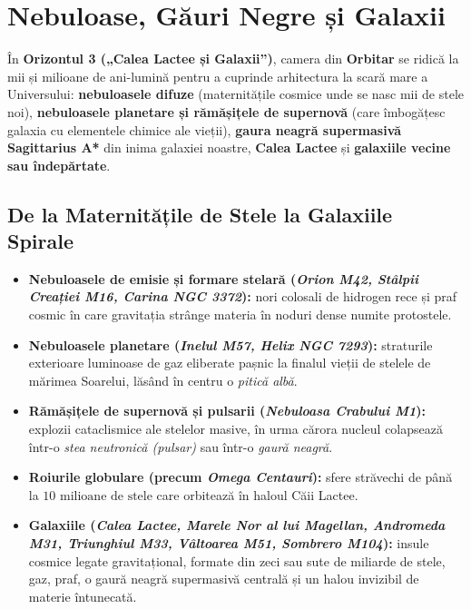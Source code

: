\chapter{Nebuloase, Găuri Negre și Galaxii}
\label{chap:galaxii}

În \textbf{Orizontul 3 („Calea Lactee și Galaxii”)}, camera din \textbf{Orbitar} se ridică la mii și milioane de ani-lumină pentru a cuprinde arhitectura la scară mare a Universului: \textbf{nebuloasele difuze} (maternitățile cosmice unde se nasc mii de stele noi), \textbf{nebuloasele planetare și rămășițele de supernovă} (care îmbogățesc galaxia cu elementele chimice ale vieții), \textbf{gaura neagră supermasivă Sagittarius A*} din inima galaxiei noastre, \textbf{Calea Lactee} și \textbf{galaxiile vecine sau îndepărtate}.

\section*{De la Maternitățile de Stele la Galaxiile Spirale}

\begin{itemize}[leftmargin=1.5em, itemsep=3pt]
  \item \textbf{Nebuloasele de emisie și formare stelară (\emph{Orion M42, Stâlpii Creației M16, Carina NGC 3372}):} nori colosali de hidrogen rece și praf cosmic în care gravitația strânge materia în noduri dense numite protostele.
  \item \textbf{Nebuloasele planetare (\emph{Inelul M57, Helix NGC 7293}):} straturile exterioare luminoase de gaz eliberate pașnic la finalul vieții de stelele de mărimea Soarelui, lăsând în centru o \emph{pitică albă}.
  \item \textbf{Rămășițele de supernovă și pulsarii (\emph{Nebuloasa Crabului M1}):} explozii cataclismice ale stelelor masive, în urma cărora nucleul colapsează într-o \emph{stea neutronică (pulsar)} sau într-o \emph{gaură neagră}.
  \item \textbf{Roiurile globulare (precum \emph{Omega Centauri}):} sfere străvechi de până la $10\text{ milioane de stele}$ care orbitează în haloul Căii Lactee.
  \item \textbf{Galaxiile (\emph{Calea Lactee, Marele Nor al lui Magellan, Andromeda M31, Triunghiul M33, Vâltoarea M51, Sombrero M104}):} insule cosmice legate gravitațional, formate din zeci sau sute de miliarde de stele, gaz, praf, o gaură neagră supermasivă centrală și un halou invizibil de materie întunecată.
\end{itemize}

